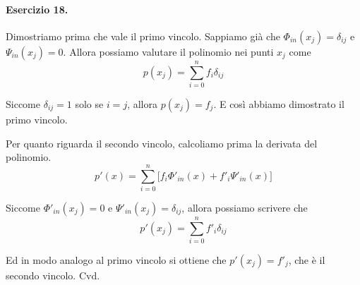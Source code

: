 \paragraph{Esercizio 18.} Dimostriamo prima che vale il primo vincolo. Sappiamo già che $\Phi_{in}(x_j) = \delta_{ij}$ e $\Psi_{in}(x_j) = 0$. Allora possiamo valutare il polinomio nei punti $x_j$ come
\[
p(x_j) = \sum_{i = 0}^n f_i \delta_{ij}
\]

Siccome $\delta_{ij} = 1$ solo se $i = j$, allora $p(x_j) = f_j$. E così abbiamo dimostrato il primo vincolo.

Per quanto riguarda il secondo vincolo, calcoliamo prima la derivata del polinomio.
\[
p'(x) = \sum_{i = 0}^n \big[f_i \Phi'_{in}(x) + f'_i \Psi'_{in}(x)\big]
\]

Siccome $\Phi'_{in}(x_j) = 0$ e $\Psi'_{in}(x_j) = \delta_{ij}$, allora possiamo scrivere che
\[
p'(x_j) = \sum_{i = 0}^n f'_i \delta_{ij}
\]

Ed in modo analogo al primo vincolo si ottiene che $p'(x_j) = f'_j$, che è il secondo vincolo. Cvd.